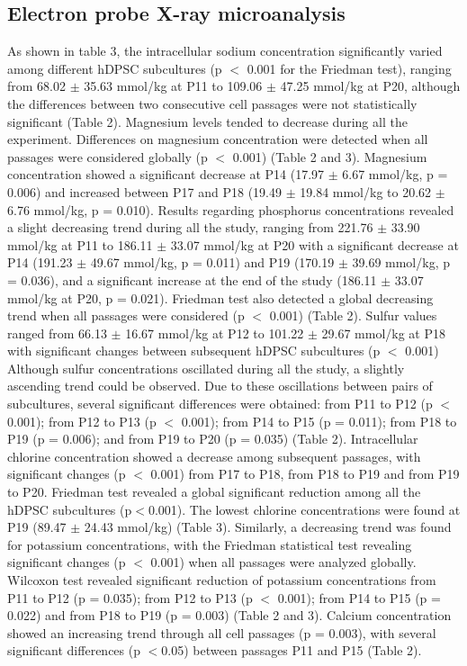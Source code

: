 \documentclass[a4paper,12pt]{article}
\begin{document}
\subsection{Electron probe X-ray microanalysis}
As shown in table 3, the intracellular sodium concentration significantly varied among different hDPSC subcultures (p $<$ 0.001 for the Friedman test), ranging from 68.02 $\pm$ 35.63 mmol/kg at P11 to 109.06 $\pm$ 47.25 mmol/kg at P20, although the differences between two consecutive cell passages were not statistically significant (Table 2).
Magnesium levels tended to decrease during all the experiment. Differences on magnesium concentration were detected when all passages were considered globally (p $<$ 0.001) (Table 2 and 3). Magnesium concentration showed a significant decrease at P14 (17.97 $\pm$ 6.67 mmol/kg, p = 0.006) and increased between P17 and P18 (19.49 $\pm$ 19.84 mmol/kg to 20.62 $\pm$ 6.76 mmol/kg, p = 0.010). 
Results regarding phosphorus concentrations revealed a slight decreasing trend during all the study, ranging from 221.76 $\pm$ 33.90 mmol/kg at P11 to 186.11 $\pm$ 33.07 mmol/kg at P20 with a significant decrease at P14 (191.23 $\pm$ 49.67 mmol/kg, p = 0.011) and P19 (170.19 $\pm$ 39.69 mmol/kg, p = 0.036), and a significant increase at the end of the study (186.11 $\pm$ 33.07 mmol/kg at P20, p = 0.021). Friedman test also detected a global decreasing trend when all passages were considered (p $<$ 0.001) (Table 2).
Sulfur values ranged from 66.13 $\pm$ 16.67 mmol/kg at P12 to 101.22 $\pm$ 29.67 mmol/kg at P18 with significant changes between subsequent hDPSC subcultures (p $<$ 0.001) Although sulfur concentrations oscillated during all the study, a slightly ascending trend could be observed. Due to these oscillations between pairs of subcultures, several significant differences were obtained: from P11 to P12 (p $<$ 0.001); from P12 to P13 (p $<$ 0.001); from P14 to P15 (p = 0.011); from P18 to P19 (p = 0.006); and from P19 to P20 (p = 0.035) (Table 2).
Intracellular chlorine concentration showed a decrease among subsequent passages, with significant changes (p $<$ 0.001) from P17 to P18, from P18 to P19 and from P19 to P20. Friedman test revealed a global significant reduction among all the hDPSC subcultures (p$<$0.001). The lowest chlorine concentrations were found at P19 (89.47 $\pm$ 24.43 mmol/kg) (Table 3).
Similarly, a decreasing trend was found for potassium concentrations, with the Friedman statistical test revealing significant changes (p $<$ 0.001) when all passages were analyzed globally. Wilcoxon test revealed significant reduction of potassium concentrations from P11 to P12 (p = 0.035); from P12 to P13 (p $<$ 0.001); from P14 to P15 (p = 0.022) and from P18 to P19 (p = 0.003) (Table 2 and 3).
Calcium concentration showed an increasing trend through all cell passages (p = 0.003), with several significant differences (p $<$0.05) between passages P11 and P15 (Table 2).
\end{document}
